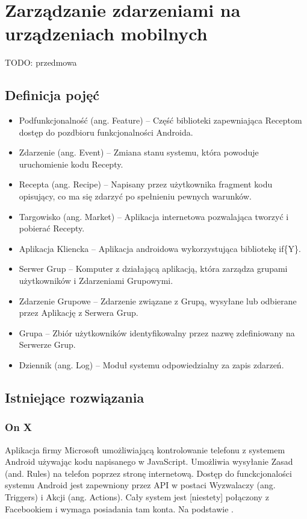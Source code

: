 \documentclass[11pt,a4paper,polish,thesis]{dcsbook}
\begin{document}
\chapter{Zarządzanie zdarzeniami na urządzeniach mobilnych}
TODO: przedmowa
\section{Definicja pojęć}
\begin{itemize}
\item Podfunkcjonalność (ang. Feature) -- Część biblioteki zapewniająca Receptom dostęp do pozdbioru funkcjonalności Androida.
\item Zdarzenie (ang. Event) -- Zmiana stanu systemu, która powoduje uruchomienie kodu Recepty.
\item Recepta (ang. Recipe) -- Napisany przez użytkownika fragment kodu opisujący, co ma się zdarzyć po spełnieniu pewnych warunków.
\item Targowisko (ang. Market) -- Aplikacja internetowa pozwalająca tworzyć i pobierać Recepty.
\item Aplikacja Kliencka -- Aplikacja androidowa wykorzystująca bibliotekę if\{Y\}. 
\item Serwer Grup -- Komputer z działającą aplikacją, która zarządza grupami użytkowników i Zdarzeniami Grupowymi.
\item Zdarzenie Grupowe -- Zdarzenie związane z Grupą, wysyłane lub odbierane przez Aplikację z Serwera Grup.
\item Grupa -- Zbiór użytkowników identyfikowalny przez nazwę zdefiniowany na Serwerze Grup.
\item Dziennik (ang. Log) -- Moduł systemu odpowiedzialny za zapis zdarzeń.
\end{itemize}
\section{Istniejące rozwiązania}
\subsection{On X}
Aplikacja firmy Microsoft umożliwiającą kontrolowanie telefonu z systemem Android używając kodu napisanego w JavaScript. Umożliwia wysyłanie Zasad (and. Rules) na
telefon poprzez stronę internetową. Dostęp do funckcjonalości systemu Android jest zapewniony przez API w postaci Wyzwalaczy (ang. Triggers) i Akcji (ang. Actions).
Cały system jest [niestety] połączony z Facebookiem i wymaga posiadania tam konta. Na podstawie \cite{onx}.
\end{document}
